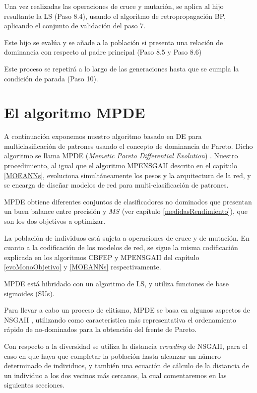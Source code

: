 Una vez realizadas las operaciones de cruce y mutación, se aplica al hijo resultante la LS (Paso
8.4), usando el algoritmo de retropropagación BP, aplicando el
conjunto de validación del paso 7.

Este hijo se evalúa y se añade a la población si presenta una relación de dominancia
con respecto al padre principal (Paso 8.5 y Paso 8.6)

Este proceso se repetirá a lo largo de las generaciones hasta que se cumpla la condición
de parada (Paso 10).

\section{El algoritmo MPDE}
\noindent A continuación exponemos nuestro algoritmo basado en DE para multiclasificación de
patrones usando el concepto de dominancia de Pareto. Dicho algoritmo se llama MPDE
(\textit{Memetic Pareto Differential Evolution}) \cite{Fernandez2009}. Nuestro procedimiento, al
igual que el algoritmo MPENSGAII descrito en el
capítulo \ref{MOEANNs}, evoluciona simultáneamente los pesos y la arquitectura de la red,
y se encarga de diseñar modelos de red para multi-clasificación de patrones.

MPDE obtiene diferentes conjuntos de clasificadores no dominados que presentan un buen
balance entre precisión y $MS$ (ver capítulo
\ref{medidasRendimiento}), que son los dos objetivos a optimizar.

La población de individuos está sujeta a operaciones de cruce y de mutación. En cuanto a la
codificación de los modelos de red, se sigue la misma codificación explicada en los algoritmos CBFEP
y MPENSGAII del capítulo \ref{evoMonoObjetivo} y \ref{MOEANNs} respectivamente.

MPDE está hibridado con un algoritmo de LS, y utiliza funciones de base sigmoides (SUs).

Para llevar a cabo un proceso de elitismo, MPDE se basa en algunos aspectos de NSGAII
\cite{Deb2002}, utilizando como característica más representativa el ordenamiento rápido
de no-dominados para la obtención del frente de Pareto.

Con respecto a la diversidad se utiliza la distancia \textit{crowding} de NSGAII, para el
caso en que haya que completar la población hasta alcanzar un número determinado de
individuos, y también una ecuación de cálculo de la distancia  de un individuo a los dos
vecinos más cercanos, la cual comentaremos en las siguientes secciones.

